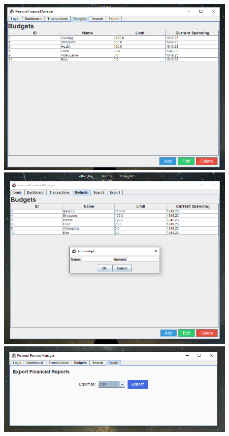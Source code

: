 \includegraphics[width=0.89\textwidth]{budgets.png} \\ 

\includegraphics[width=0.89\textwidth]{budget_add.png} \\ 

\includegraphics[width=0.89\textwidth]{export.png} \\ 

